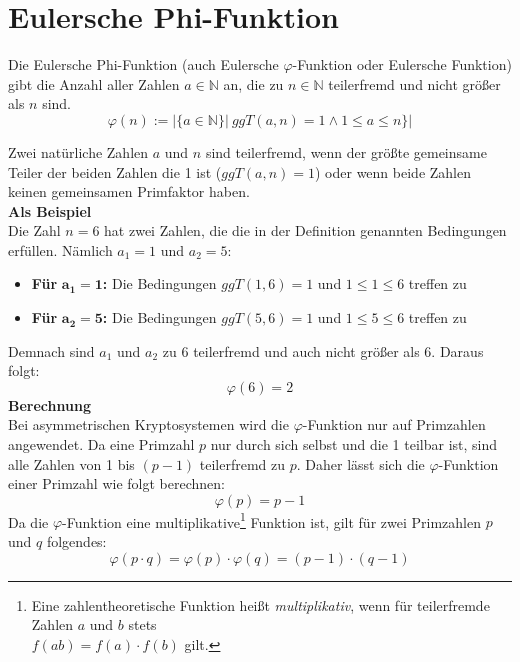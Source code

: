 \section{Eulersche Phi-Funktion}
\label{sec:Euler_Phi_Funktion}
\begin{Euler}
\label{def_Eulerfunktion}
Die Eulersche Phi-Funktion (auch Eulersche $\varphi$-Funktion oder Eulersche Funktion) gibt die Anzahl aller Zahlen $a \in \mathbb{N}$ an, die zu $n \in \mathbb{N}$ teilerfremd und nicht größer als $n$ sind.
\begin{equation*}
\varphi(n):=\Big| \{a \in \mathbb{N}\} \big|~ggT(a,n)=1 \land 1 \le a \le n \} \Big|
\end{equation*}
\end{Euler}
Zwei natürliche Zahlen $a$ und $n$ sind teilerfremd, wenn der größte gemeinsame Teiler der beiden Zahlen die 1 ist ($ggT(a,n)=1$) oder wenn beide Zahlen keinen gemeinsamen Primfaktor haben.\\
\textbf{Als Beispiel}\\
Die Zahl $n=6$ hat zwei Zahlen, die die in der Definition genannten Bedingungen erfüllen. Nämlich $a_1=1$ und $a_2=5$:
\begin{itemize}
\item \textbf{Für} $\mathbf{a_1=1}$\textbf{:} Die Bedingungen $ggT(1,6)=1$ und $1\le1\le6$ treffen zu
\item \textbf{Für} $\mathbf{a_2=5}$\textbf{:} Die Bedingungen $ggT(5,6)=1$ und $1\le5\le6$ treffen zu
\end{itemize}
Demnach sind $a_1$ und $a_2$ zu 6 teilerfremd und auch nicht größer als 6. Daraus folgt:
\begin{equation*}
\varphi(6)=2
\end{equation*}
\textbf{Berechnung}\\
Bei asymmetrischen Kryptosystemen wird die $\varphi$-Funktion nur auf Primzahlen angewendet. Da eine Primzahl $p$ nur durch sich selbst und die 1 teilbar ist, sind alle Zahlen von 1 bis $(p-1)$ teilerfremd zu $p$. Daher lässt sich die $\varphi$-Funktion einer Primzahl wie folgt berechnen:
\begin{equation*}
\varphi(p)=p-1
\end{equation*}
Da die $\varphi$-Funktion eine multiplikative\footnote{Eine zahlentheoretische Funktion heißt \textit{multiplikativ}, wenn für teilerfremde Zahlen $a$ und $b$ stets\\$f(ab)=f(a)\cdot f(b)$ gilt.} Funktion ist, gilt für zwei Primzahlen $p$ und $q$ folgendes:
\begin{equation*}
\varphi(p\cdot q)=\varphi(p)\cdot \varphi(q)=(p-1)\cdot(q-1)
\end{equation*}

